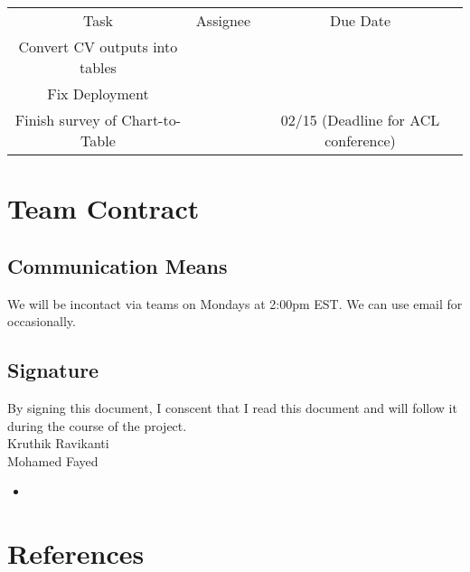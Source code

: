 \documentclass[
	letterpaper, %
]{jdf}
\begin{document}
            \begin{table}
                 \begin{tabular}{|c|c|c|}
                     Task & Assignee & Due Date \\
                     Convert CV outputs into tables & & \\
                     Fix Deployment & & \\
                     Finish survey of Chart-to-Table & & 02/15 (Deadline for ACL conference) \\
                 \end{tabular}
                 \caption{}
                 \label{}
                  \end{table}

\section{Team Contract}\label{sect:team-contract}
\subsection{Communication Means}
We will be incontact via teams on Mondays at 2:00pm EST.
We can use email for occasionally.
\subsection{Signature}
By signing this document, I conscent that I read this document and will follow it
during the course of the project.\\
Kruthik Ravikanti \\
Mohamed Fayed
\begin{itemize}
         \item 
              \end{itemize}

\section{References}
\printbibliography[heading=none]
\end{document}
